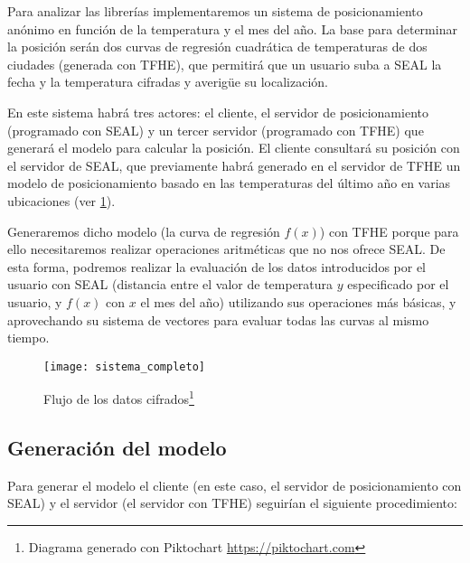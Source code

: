 Para analizar las librerías implementaremos un sistema de posicionamiento anónimo en función de la temperatura y el mes del año. La base para determinar la posición serán dos curvas de regresión cuadrática de temperaturas de dos ciudades (generada con TFHE), que permitirá que un usuario suba a SEAL la fecha y la temperatura cifradas y averigüe su localización.

En este sistema habrá tres actores: el cliente, el servidor de posicionamiento (programado con SEAL) y un tercer servidor (programado con TFHE) que generará el modelo para calcular la posición. El cliente consultará su posición con el servidor de SEAL, que previamente habrá generado en el servidor de TFHE un modelo de posicionamiento basado en las temperaturas del último año en varias ubicaciones (ver \ref{fig:sistema_completo}).

Generaremos dicho modelo (la curva de regresión $f(x)$) con TFHE porque para ello necesitaremos realizar operaciones aritméticas que no nos ofrece SEAL. De esta forma, podremos realizar la evaluación de los datos introducidos por el usuario con SEAL (distancia entre el valor de temperatura $y$ especificado por el usuario, y $f(x)$ con $x$ el mes del año) utilizando sus operaciones más básicas, y aprovechando su sistema de vectores para evaluar todas las curvas al mismo tiempo.

\begin{figure}[h]
    \caption{Flujo de los datos cifrados\footnote{Diagrama generado con Piktochart \url{https://piktochart.com}}}
    \label{fig:sistema_completo}
    \texttt{[image: sistema\_completo]}
\end{figure}

\subsection{Generación del modelo}

Para generar el modelo el cliente (en este caso, el servidor de posicionamiento con SEAL) y el servidor (el servidor con TFHE) seguirían el siguiente procedimiento:

